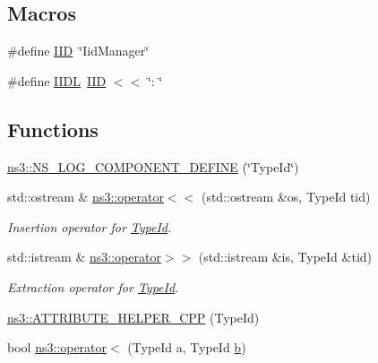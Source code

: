 \subsection*{Macros}
\begin{DoxyCompactItemize}
\item 
\#define \hyperlink{type-id_8cc_a88c5717498eac8c8d6a06538e6c65d49}{I\+ID}~\char`\"{}Iid\+Manager\char`\"{}
\item 
\#define \hyperlink{type-id_8cc_a3d266412e7a8a083ee1636faffe4ca8c}{I\+I\+DL}~\hyperlink{type-id_8cc_a88c5717498eac8c8d6a06538e6c65d49}{I\+ID} $<$$<$ \char`\"{}\+: \char`\"{}
\end{DoxyCompactItemize}
\subsection*{Functions}
\begin{DoxyCompactItemize}
\item 
\hyperlink{namespacens3_a45c16439fb7a4644ce2e0b91386d9e5e}{ns3\+::\+N\+S\+\_\+\+L\+O\+G\+\_\+\+C\+O\+M\+P\+O\+N\+E\+N\+T\+\_\+\+D\+E\+F\+I\+NE} (\char`\"{}Type\+Id\char`\"{})
\item 
std\+::ostream \& \hyperlink{namespacens3_a44832a834821fb3a5c7d2f88aa3c8fe3}{ns3\+::operator$<$$<$} (std\+::ostream \&os, Type\+Id tid)
\begin{DoxyCompactList}\small\item\em Insertion operator for \hyperlink{classns3_1_1TypeId}{Type\+Id}. \end{DoxyCompactList}\item 
std\+::istream \& \hyperlink{namespacens3_a0517415d68e11b29a8d9f539eef3ff1d}{ns3\+::operator$>$$>$} (std\+::istream \&is, Type\+Id \&tid)
\begin{DoxyCompactList}\small\item\em Extraction operator for \hyperlink{classns3_1_1TypeId}{Type\+Id}. \end{DoxyCompactList}\item 
\hyperlink{namespacens3_a240e1cf730221100e80ba064faf563b9}{ns3\+::\+A\+T\+T\+R\+I\+B\+U\+T\+E\+\_\+\+H\+E\+L\+P\+E\+R\+\_\+\+C\+PP} (Type\+Id)
\end{DoxyCompactItemize}
{\bf }\par
\begin{DoxyCompactItemize}
\item 
bool \hyperlink{namespacens3_a5b694614b4f77fd56e8e2f4db05242e2}{ns3\+::operator$<$} (Type\+Id a, Type\+Id \hyperlink{lte__pathloss_8m_a21ad0bd836b90d08f4cf640b4c298e7c}{b})
\end{DoxyCompactItemize}



